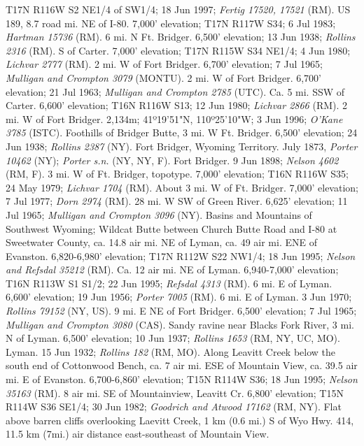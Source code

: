 T17N R116W S2 NE1/4 of SW1/4; 18 Jun 1997; \textit{Fertig 17520, 17521} (RM).
US 189, 8.7 road mi. NE of I-80. 7,000' elevation; T17N R117W S34; 6 Jul 1983;
\textit{Hartman 15736} (RM).
6 mi. N Ft. Bridger. 6,500' elevation; 13 Jun 1938; \textit{Rollins 2316} (RM).
S of Carter. 7,000' elevation; T17N R115W S34 NE1/4; 4 Jun 1980;
\textit{Lichvar 2777} (RM).
2 mi. W of Fort Bridger. 6,700’ elevation; 7 Jul 1965;
\textit{Mulligan and Crompton 3079} (MONTU).
2 mi. W of Fort Bridger. 6,700’ elevation; 21 Jul 1963;
\textit{Mulligan and Crompton 2785} (UTC).
Ca. 5 mi. SSW of Carter. 6,600' elevation; T16N R116W S13; 12 Jun 1980;
\textit{Lichvar 2866} (RM).
2 mi. W of Fort Bridger. 2,134m; 41º19'51"N, 110º25'10"W; 3 Jun 1996;
\textit{O'Kane 3785} (ISTC).
Foothills of Bridger Butte, 3 mi. W Ft. Bridger. 6,500’ elevation; 24 Jun 1938;
\textit{Rollins 2387} (NY).
Fort Bridger, Wyoming Territory. July 1873, \textit{Porter 10462} (NY);
\textit{Porter s.n.} (NY, NY, F).
Fort Bridger. 9 Jun 1898; \textit{Nelson 4602} (RM, F).
3 mi. W of Ft. Bridger, topotype.	7,000' elevation; T16N R116W S35; 24 May 1979;
\textit{Lichvar 1704} (RM).
About 3 mi. W of Ft. Bridger. 7,000' elevation;	7 Jul 1977;
\textit{Dorn 2974} (RM).
28 mi. W SW of Green River. 6,625’ elevation; 11 Jul 1965;
\textit{Mulligan and Crompton 3096} (NY).
Basins and Mountains of Southwest Wyoming; Wildcat Butte between Church Butte
Road and I-80 at Sweetwater County, ca. 14.8 air mi. NE of Lyman, ca. 49 air mi.
ENE of Evanston.  6,820-6,980' elevation; T17N R112W S22 NW1/4; 18 Jun 1995;
\textit{Nelson and Refsdal 35212} (RM).
Ca. 12 air mi. NE of Lyman. 6,940-7,000' elevation; T16N R113W S1 S1/2;
22 Jun 1995; \textit{Refsdal 4313} (RM).
6 mi. E of Lyman. 6,600’ elevation; 19 Jun 1956; \textit{Porter 7005} (RM).
6 mi. E of Lyman. 3 Jun 1970; \textit{Rollins 79152} (NY, US).
9 mi. E NE of Fort Bridger. 6,500’ elevation; 7 Jul 1965;
\textit{Mulligan and Crompton 3080} (CAS).
Sandy ravine near Blacks Fork River, 3 mi. N of Lyman.	6,500' elevation;
10 Jun 1937; \textit{Rollins 1653} (RM, NY, UC, MO).
Lyman. 15 Jun 1932; \textit{Rollins 182} (RM, MO).
Along Leavitt Creek below the south end of Cottonwood Bench, ca. 7 air mi. ESE
of Mountain View, ca. 39.5 air mi. E of Evanston.	6,700-6,860' elevation;
T15N R114W S36; 18 Jun 1995; \textit{Nelson 35163} (RM).
8 air mi. SE of Mountainview, Leavitt Cr. 6,800' elevation;
T15N R114W S36 SE1/4; 30 Jun 1982; \textit{Goodrich and Atwood 17162} (RM, NY).
Flat above barren cliffs overlooking Laevitt Creek, 1 km (0.6 mi.) S of Wyo Hwy.
414, 11.5 km (7mi.) air distance east-southeast of Mountain View.
